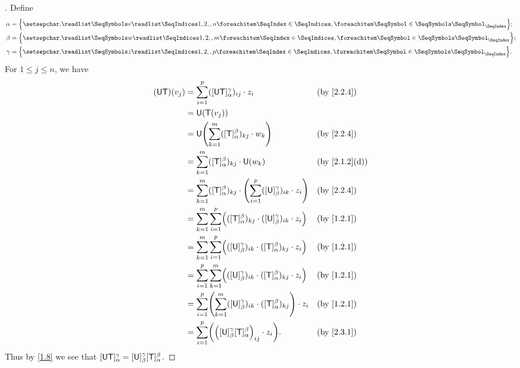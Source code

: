 \begin{proof}[]
	Define
	\begin{align*}
		\alpha & = \set{\seq{v}{1,2,,n}}; \\
		\beta  & = \set{\seq{w}{1,2,,m}}; \\
		\gamma & = \set{\seq{z}{1,2,,p}}.
	\end{align*}
	For \(1 \leq j \leq n\), we have
	\begin{align*}
		(\U \T)(v_j) & = \sum_{i = 1}^p ([\U \T]_{\alpha}^{\gamma})_{i j} \cdot z_i                                                      &  & \by{2.2.4}    \\
		             & = \U(\T(v_j))                                                                                                                        \\
		             & = \U\pa{\sum_{k = 1}^m ([\T]_{\alpha}^{\beta})_{k j} \cdot w_k}                                                   &  & \by{2.2.4}    \\
		             & = \sum_{k = 1}^m ([\T]_{\alpha}^{\beta})_{k j} \cdot \U(w_k)                                                      &  & \by{2.1.2}[d] \\
		             & = \sum_{k = 1}^m ([\T]_{\alpha}^{\beta})_{k j} \cdot \pa{\sum_{i = 1}^p ([\U]_{\beta}^{\gamma})_{i k} \cdot z_i}  &  & \by{2.2.4}    \\
		             & = \sum_{k = 1}^m \sum_{i = 1}^p \pa{([\T]_{\alpha}^{\beta})_{k j}  \cdot ([\U]_{\beta}^{\gamma})_{i k} \cdot z_i} &  & \by{1.2.1}    \\
		             & = \sum_{k = 1}^m \sum_{i = 1}^p \pa{([\U]_{\beta}^{\gamma})_{i k} \cdot ([\T]_{\alpha}^{\beta})_{k j} \cdot z_i}  &  & \by{1.2.1}    \\
		             & = \sum_{i = 1}^p \sum_{k = 1}^m \pa{([\U]_{\beta}^{\gamma})_{i k} \cdot ([\T]_{\alpha}^{\beta})_{k j} \cdot z_i}  &  & \by{1.2.1}    \\
		             & = \sum_{i = 1}^p \pa{\sum_{k = 1}^m ([\U]_{\beta}^{\gamma})_{i k} \cdot ([\T]_{\alpha}^{\beta})_{k j}} \cdot z_i  &  & \by{1.2.1}    \\
		             & = \sum_{i = 1}^p \pa{\pa{[\U]_{\beta}^{\gamma} [\T]_{\alpha}^{\beta}}_{i j} \cdot z_i}.                           &  & \by{2.3.1}
	\end{align*}
	Thus by \cref{1.8} we see that \([\mathsf{U} \mathsf{T}]_{\alpha}^{\gamma} = [\mathsf{U}]_{\beta}^{\gamma} [\mathsf{T}]_{\alpha}^{\beta}\).
\end{proof}


